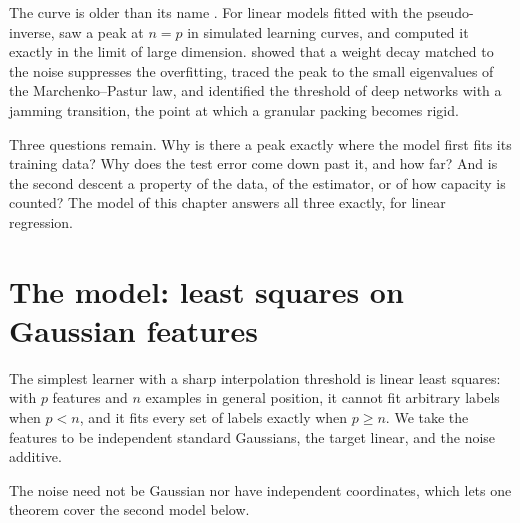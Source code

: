 \begin{refsection}
The curve is older than its name \parencite{LoogEtAl2020}. For linear models fitted with the pseudo-inverse, \textcite{ValletEtAl1989} saw a peak at $n=p$ in simulated learning curves, and \textcite{OpperEtAl1990} computed it exactly in the limit of large dimension. \Textcite{KroghHertz1992} showed that a weight decay matched to the noise suppresses the overfitting, \textcite{AdvaniEtAl2020} traced the peak to the small eigenvalues of the Marchenko--Pastur law, and \textcite{SpiglerEtAl2019} identified the threshold of deep networks with a jamming transition, the point at which a granular packing becomes rigid.

Three questions remain. Why is there a peak exactly where the model first fits its training data? Why does the test error come down past it, and how far? And is the second descent a property of the data, of the estimator, or of how capacity is counted? The model of this chapter answers all three exactly, for linear regression.

\section{The model: least squares on Gaussian features}\label{sec:doubledescent:model}

The simplest learner with a sharp interpolation threshold is linear least squares: with $p$ features and $n$ examples in general position, it cannot fit arbitrary labels when $p<n$, and it fits every set of labels exactly when $p\ge n$. We take the features to be independent standard Gaussians, the target linear, and the noise additive.


The noise need not be Gaussian nor have independent coordinates, which lets one theorem cover the second model below.


\end{refsection}
